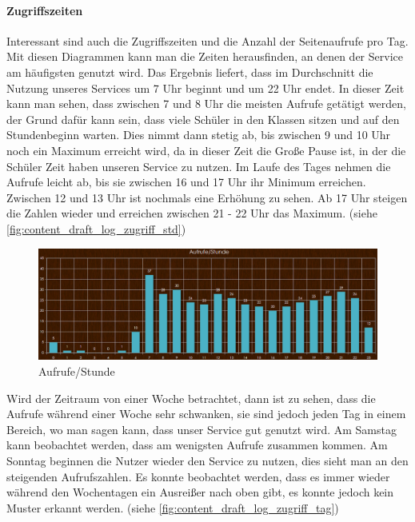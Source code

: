 \paragraph{Zugriffszeiten\\}
Interessant sind auch die Zugriffszeiten und die Anzahl der Seitenaufrufe pro Tag.\\
Mit diesen Diagrammen kann man die Zeiten herausfinden, an denen der Service am häufigsten genutzt wird. Das Ergebnis liefert, dass im Durchschnitt die Nutzung unseres Services um 7 Uhr beginnt und um 22 Uhr endet. In dieser Zeit kann man sehen, dass zwischen 7 und 8 Uhr die meisten Aufrufe getätigt werden, der Grund dafür kann sein, dass viele Schüler in den Klassen sitzen und auf den Stundenbeginn warten. Dies nimmt dann stetig ab, bis zwischen 9 und 10 Uhr noch ein Maximum erreicht wird, da in dieser Zeit die Große Pause ist, in der die Schüler Zeit haben unseren Service zu nutzen. Im Laufe des Tages nehmen die Aufrufe leicht ab, bis sie zwischen 16 und 17 Uhr ihr Minimum erreichen. Zwischen 12 und 13 Uhr ist nochmals eine Erhöhung zu sehen. Ab 17 Uhr steigen die Zahlen wieder und erreichen zwischen 21 - 22 Uhr das Maximum. (siehe \autoref{fig:content_draft_log_zugriff_std})

\begin{figure}[H]
\centering
\includegraphics[keepaspectratio=true, width=17cm]{images/screenshots/statistics/aufruf_std.png}
\caption{Aufrufe/Stunde}
\label{fig:content_draft_log_zugriff_std}
\end{figure}

Wird der Zeitraum von einer Woche betrachtet, dann ist zu sehen, dass die Aufrufe während einer Woche sehr schwanken, sie sind jedoch jeden Tag in einem Bereich, wo man sagen kann, dass unser Service gut genutzt wird. Am Samstag kann beobachtet werden, dass am wenigsten Aufrufe zusammen kommen. Am Sonntag beginnen die Nutzer wieder den Service zu nutzen, dies sieht man an den steigenden Aufrufszahlen. Es konnte beobachtet werden, dass es immer wieder während den Wochentagen ein Ausreißer nach oben gibt, es konnte jedoch kein Muster erkannt werden. (siehe \autoref{fig:content_draft_log_zugriff_tag})


